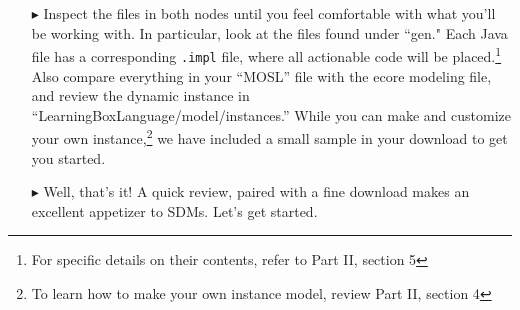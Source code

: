 \begin{itemize}

\item[$\blacktriangleright$] Inspect the files in both nodes until you feel comfortable with what you'll be working with. In particular, look at the
files found under ``gen." Each Java file has a corresponding \texttt{.impl} file, where all actionable code will be placed.\footnote{For specific details on
their contents, refer to Part II, section 5} Also compare everything in your ``MOSL'' file with the ecore modeling file, and review the dynamic instance in
``LearningBoxLanguage/model/instances.'' While you can make and customize your own instance,\footnote{To learn how to make your own instance model, review Part
II, section 4} we have included a small sample in your download to get you started.

\item[$\blacktriangleright$] Well, that's it! A quick review, paired with a fine download makes an excellent appetizer to SDMs. Let's get started.

\end{itemize}
